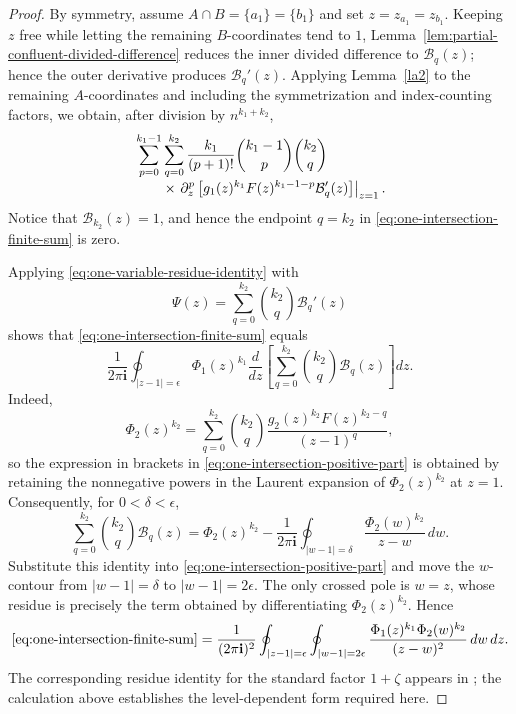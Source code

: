 \documentclass[11pt]{amsart}
\theoremstyle{plain}
\numberwithin{equation}{section}
\numberwithin{theorem}{section}
\numberwithin{figure}{section}
\begin{document}
\begin{proof}
By symmetry, assume
\(A\cap B=\{a_1\}=\{b_1\}\) and set
\(z=z_{a_1}=z_{b_1}\).
Keeping \(z\) free while letting the remaining \(B\)-coordinates tend
to \(1\), Lemma~\ref{lem:partial-confluent-divided-difference}
reduces the inner divided difference to \(\mathcal B_q(z)\); hence the
outer derivative produces \(\mathcal B_q'(z)\).
Applying Lemma~\ref{la2} to the remaining \(A\)-coordinates and
including the symmetrization and index-counting factors, we obtain,
after division by \(n^{k_1+k_2}\),
\begin{align}
&\sum_{p=0}^{k_1-1}\sum_{q=0}^{k_2}
\frac{k_1}{(p+1)!}
\binom{k_1-1}{p}\binom{k_2}{q}
\notag\\[-1mm]
&\qquad\times
\left.
\partial_z^p
\left[
    g_1(z)^{k_1}F(z)^{k_1-1-p}\mathcal B_q'(z)
\right]
\right|_{z=1}.
\label{eq:one-intersection-finite-sum}
\end{align}
Notice that $\mathcal B_{k_2}(z)=1$, and hence the endpoint $q=k_2$ in
\eqref{eq:one-intersection-finite-sum} is zero.  

Applying \eqref{eq:one-variable-residue-identity} with
\[
    \Psi(z)
    =
    \sum_{q=0}^{k_2}
    \binom{k_2}{q}\mathcal B_q'(z)
\]
shows that \eqref{eq:one-intersection-finite-sum} equals
\begin{equation}
    \frac1{2\pi\mathbf i}
    \oint_{|z-1|=\epsilon}
    \Phi_1(z)^{k_1}
    \frac{d}{dz}
    \left[
        \sum_{q=0}^{k_2}
        \binom{k_2}{q}\mathcal B_q(z)
    \right]dz.
    \label{eq:one-intersection-positive-part}
\end{equation}
Indeed,
\[
    \Phi_2(z)^{k_2}
    =
    \sum_{q=0}^{k_2}
    \binom{k_2}{q}
    \frac{
        g_2(z)^{k_2}F(z)^{k_2-q}
    }{
        (z-1)^q
    },
\]
so the expression in brackets in
\eqref{eq:one-intersection-positive-part} is obtained by retaining the
nonnegative powers in the Laurent expansion of
\(\Phi_2(z)^{k_2}\) at \(z=1\). Consequently, for
\(0<\delta<\epsilon\),
\[
    \sum_{q=0}^{k_2}
    \binom{k_2}{q}\mathcal B_q(z)
    =
    \Phi_2(z)^{k_2}
    -
    \frac1{2\pi\mathbf i}
    \oint_{|w-1|=\delta}
    \frac{\Phi_2(w)^{k_2}}{z-w}\,dw.
\]
Substitute this identity into
\eqref{eq:one-intersection-positive-part} and move the \(w\)-contour
from \(|w-1|=\delta\) to \(|w-1|=2\epsilon\). The only crossed pole is
\(w=z\), whose residue is precisely the term obtained by
differentiating \(\Phi_2(z)^{k_2}\). Hence
\begin{equation}
\eqref{eq:one-intersection-finite-sum}
=
\frac1{(2\pi\mathbf i)^2}
\oint_{|z-1|=\epsilon}
\oint_{|w-1|=2\epsilon}
\frac{\Phi_1(z)^{k_1}\Phi_2(w)^{k_2}}
     {(z-w)^2}\,dw\,dz.
\label{eq:one-intersection-contour}
\end{equation}
The corresponding residue identity for the standard factor
\(1+\zeta\) appears in \cite[Lemma~6.2]{bg16}; the calculation above
establishes the level-dependent form required here.


\end{proof}
\end{document}
